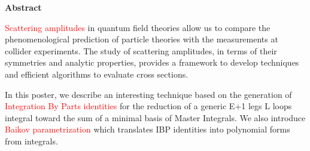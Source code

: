 \documentclass[10pt]{article}
\begin{document}
\textbf{Abstract}

\textcolor{red}{Scattering amplitudes} in quantum field theories allow us to compare the phenomenological prediction of particle theories with the measurements at collider experiments.
The study of scattering amplitudes, in terms of their symmetries and analytic properties, provides a framework to develop techniques and efficient algorithms to evaluate cross sections.

In this poster, we describe an interesting technique based on the generation of \textcolor{red}{Integration By Parts identities} for the reduction of a generic E+1 legs L loops integral toward the sum of a minimal basis of Master Integrals.
We also introduce \textcolor{red}{Baikov parametrization} which translates IBP identities into polynomial forms from integrals.

\begin{center}
\end{center}
\end{document}
